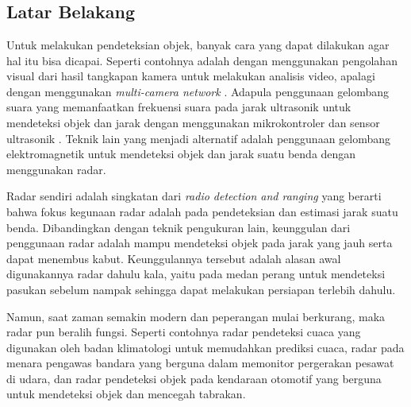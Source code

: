 \chapter{\babSatu}
\section{Latar Belakang}
Untuk melakukan pendeteksian objek, banyak cara yang dapat dilakukan agar hal itu bisa dicapai. Seperti contohnya adalah dengan menggunakan pengolahan visual dari hasil tangkapan kamera untuk melakukan analisis video, apalagi dengan menggunakan \textit{multi-camera network} \cite{Zhang2015}. Adapula penggunaan gelombang suara yang memanfaatkan frekuensi suara pada jarak ultrasonik untuk mendeteksi objek dan jarak dengan menggunakan mikrokontroler dan sensor ultrasonik \cite{Biswas2020}. Teknik lain yang menjadi alternatif adalah penggunaan gelombang elektromagnetik untuk mendeteksi objek dan jarak suatu benda dengan menggunakan radar. 

Radar sendiri adalah singkatan dari \textit{radio detection and ranging} yang berarti bahwa fokus kegunaan radar adalah pada pendeteksian dan estimasi jarak suatu benda. Dibandingkan dengan teknik pengukuran lain, keunggulan dari penggunaan radar adalah mampu mendeteksi objek pada jarak yang jauh serta dapat menembus kabut. Keunggulannya tersebut adalah alasan awal digunakannya radar dahulu kala, yaitu  pada medan perang untuk mendeteksi pasukan sebelum nampak sehingga dapat melakukan persiapan terlebih dahulu. 

Namun, saat zaman semakin modern dan peperangan mulai berkurang, maka radar pun beralih fungsi. Seperti contohnya radar pendeteksi cuaca yang digunakan oleh badan klimatologi untuk memudahkan prediksi cuaca, radar pada menara pengawas bandara yang berguna dalam memonitor pergerakan pesawat di udara, dan radar pendeteksi objek pada kendaraan otomotif yang berguna untuk mendeteksi objek dan mencegah tabrakan.

